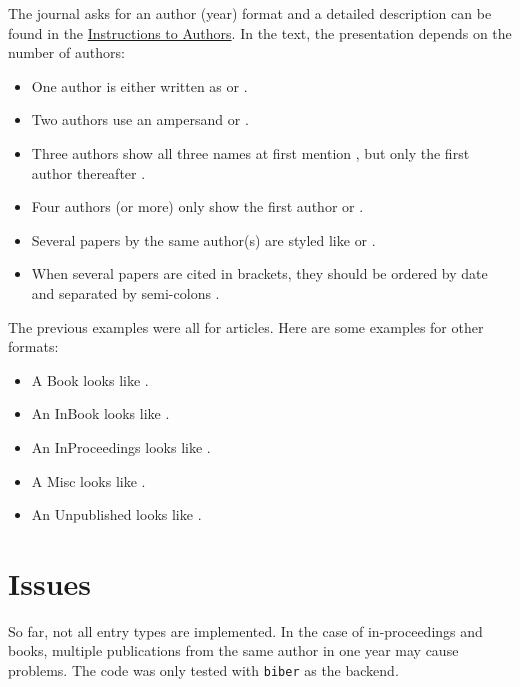 \documentclass{scrartcl}
\begin{document}
The journal asks for an author (year) format and a detailed description can be found in the \href{https://academic.oup.com/mnras/pages/general_instructions?login=false#6.3\%20References\%20and\%20citations}{Instructions to Authors}. 
In the text, the presentation depends on the number of authors:
\begin{itemize}
    \setlength{\itemsep}{-3pt}
    \item One author is either written as \textcite{ArticleOneA} or \parencite{ArticleOneA}.
    \item Two authors use an ampersand \textcite{ArticleTwo} or \parencite{ArticleTwo}. 
    \item Three authors show all three names at first mention \parencite{ArticleThree}, but only the first author thereafter \parencite{ArticleThree}.
    \item Four authors (or more) only show the first author \textcite{ArticleFourA} or \parencite{ArticleFourA}.
    \item Several papers by the same author(s) are styled like \parencite{ArticleOneA,ArticleOneB} or \parencite{ArticleFourB,ArticleFourC}.
    \item When several papers are cited in brackets, they should be ordered by date and separated by semi-colons \parencite{ArticleOneA,ArticleThree,ArticleTwo}.
\end{itemize}
The previous examples were all for articles. Here are some examples for other formats:
\begin{itemize}
    \setlength{\itemsep}{-3pt}
    \item A Book looks like \textcite{Book}.
    \item An InBook looks like \textcite{InBook}.
    \item An InProceedings looks like \textcite{InProceedings}.
    \item A Misc looks like \textcite{Misc}.
    \item An Unpublished looks like \textcite{Unpublished}.
\end{itemize}


\newrefcontext[sorting=nyt]
\printbibliography[prenote=myprenote,title={References}]

\section*{Issues}

So far, not all entry types are implemented.
In the case of in-proceedings and books, multiple publications from the same author in one year may cause problems. 
The code was only tested with \texttt{biber} as the backend.
\end{document}
